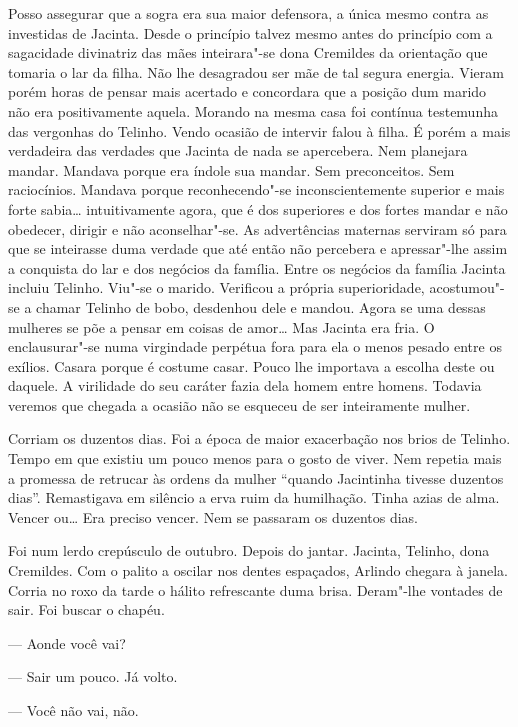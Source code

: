 Posso assegurar que a sogra era sua maior defensora, a única mesmo
contra as investidas de Jacinta. Desde o princípio talvez mesmo antes do
princípio com a sagacidade divinatriz das mães inteirara"-se dona
Cremildes da orientação que tomaria o lar da filha. Não lhe desagradou
ser mãe de tal segura energia. Vieram porém horas de pensar mais
acertado e concordara que a posição dum marido não era positivamente
aquela. Morando na mesma casa foi contínua testemunha das vergonhas do
Telinho. Vendo ocasião de intervir falou à filha. É porém a mais
verdadeira das verdades que Jacinta de nada se apercebera. Nem planejara
mandar. Mandava porque era índole sua mandar. Sem preconceitos. Sem
raciocínios. Mandava porque reconhecendo"-se inconscientemente superior e
mais forte sabia\ldots{} intuitivamente agora, que é dos superiores e dos
fortes mandar e não obedecer, dirigir e não aconselhar"-se. As
advertências maternas serviram só para que se inteirasse duma verdade
que até então não percebera e apressar"-lhe assim a conquista do lar e
dos negócios da família. Entre os negócios da família Jacinta incluiu
Telinho. Viu"-se o marido. Verificou a própria superioridade,
acostumou"-se a chamar Telinho de bobo, desdenhou dele e mandou. Agora se
uma dessas mulheres se põe a pensar em coisas de amor\ldots{} Mas Jacinta era
fria. O enclausurar"-se numa virgindade perpétua fora para ela o menos
pesado entre os exílios. Casara porque é costume casar. Pouco lhe
importava a escolha deste ou daquele. A virilidade do seu caráter fazia
dela homem entre homens. Todavia veremos que chegada a ocasião não se
esqueceu de ser inteiramente mulher.

Corriam os duzentos dias. Foi a época de maior exacerbação nos brios de
Telinho. Tempo em que existiu um pouco menos para o gosto de viver. Nem
repetia mais a promessa de retrucar às ordens da mulher ``quando
Jacintinha tivesse duzentos dias''. Remastigava em silêncio a erva ruim
da humilhação. Tinha azias de alma. Vencer ou\ldots{} Era preciso vencer. Nem
se passaram os duzentos dias.

Foi num lerdo crepúsculo de outubro. Depois do jantar. Jacinta, Telinho,
dona Cremildes. Com o palito a oscilar nos dentes espaçados, Arlindo
chegara à janela. Corria no roxo da tarde o hálito refrescante duma
brisa. Deram"-lhe vontades de sair. Foi buscar o chapéu.

--- Aonde você vai?

--- Sair um pouco. Já volto.

--- Você não vai, não.

